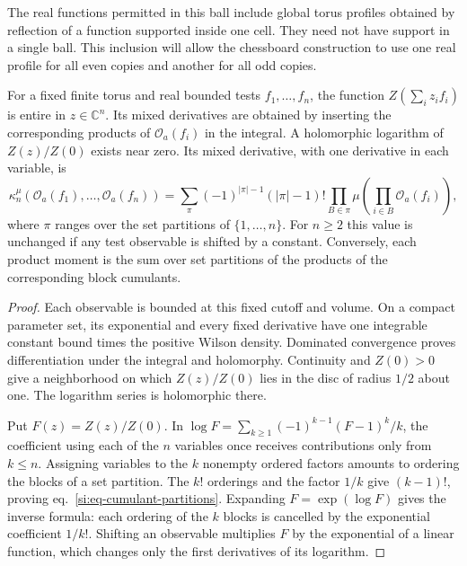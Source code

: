 \documentclass[11pt,letterpaper,reqno]{amsart}
\makeatletter
\numberwithin{equation}{section}
\renewcommand{\eqref}[1]{\textup{eq.~\ref{#1}}}
\theoremstyle{definition}
\newcommand{\ms@minorstart}{%
  \pushQED{\qed}\renewcommand{\qedsymbol}{$\blacksquare$}}
\newenvironment{lemma}[1][]{\ms@minorstart\ms@lemma[#1]}
  {\popQED\endms@lemma}
\theoremstyle{remark}
\makeatother
\begin{document}
The real functions permitted in this ball include global torus
profiles obtained by reflection of a function supported inside one
cell. They need not have support in a single ball. This inclusion
will allow the chessboard construction to use one real profile for
all even copies and another for all odd copies.

\begin{samepage}
\begin{lemma}[Finite source derivatives]\label{si:lem-finite-derivatives}
For a fixed finite torus and real bounded tests $f_1,\ldots,f_n$, the
function $Z(\sum_i z_if_i)$ is entire in $z\in\mathbb C^n$. Its
mixed derivatives are obtained by inserting the corresponding
products of $\mathcal O_a(f_i)$ in the integral. A holomorphic
logarithm of $Z(z)/Z(0)$ exists near zero. Its mixed derivative,
with one derivative in each variable, is
\begin{equation}\label{si:eq-cumulant-partitions}
 \kappa_n^{\mu}(\mathcal O_a(f_1),\ldots,\mathcal O_a(f_n))
 =\sum_{\pi}(-1)^{|\pi|-1}(|\pi|-1)!
     \prod_{B\in\pi}\mu\!\left(\prod_{i\in B}\mathcal O_a(f_i)\right),
\end{equation}
where $\pi$ ranges over the set partitions of $\{1,\ldots,n\}$.
For $n\ge2$ this value is unchanged if any test observable is
shifted by a constant. Conversely, each product moment is the
sum over set partitions of the products of the corresponding
block cumulants.
\end{lemma}
\end{samepage}
\begin{proof}
Each observable is bounded at this fixed cutoff and volume. On a
compact parameter set, its exponential and every fixed derivative
have one integrable constant bound times the positive Wilson
density. Dominated convergence proves differentiation under the
integral and holomorphy. Continuity and $Z(0)>0$ give a neighborhood
on which $Z(z)/Z(0)$ lies in the disc of radius $1/2$ about one.
The logarithm series is holomorphic there.

Put $F(z)=Z(z)/Z(0)$. In
$\log F=\sum_{k\ge1}(-1)^{k-1}(F-1)^k/k$, the coefficient using
each of the $n$ variables once receives contributions only from
$k\le n$. Assigning variables to the $k$ nonempty ordered factors
amounts to ordering the blocks of a set partition. The $k!$
orderings and the factor $1/k$ give $(k-1)!$, proving
\eqref{si:eq-cumulant-partitions}. Expanding $F=\exp(\log F)$
gives the inverse formula: each ordering of the $k$ blocks is
cancelled by the exponential coefficient $1/k!$. Shifting an observable multiplies
$F$ by the exponential of a linear function, which changes only
the first derivatives of its logarithm.
\end{proof}
\end{document}
